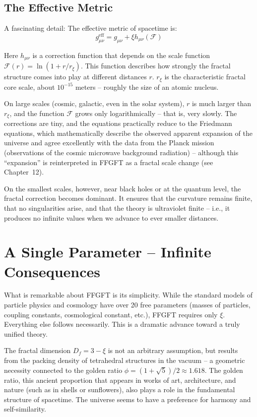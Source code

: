 \subsection{The Effective Metric}

A fascinating detail: The effective metric of spacetime is:
\begin{equation}
g_{\mu\nu}^{\text{eff}} = g_{\mu\nu} + \xi h_{\mu\nu}(\mathcal{F})
\end{equation}

Here $h_{\mu\nu}$ is a correction function that depends on the scale function $\mathcal{F}(r) = \ln(1 + r/r_\xi)$. This function describes how strongly the fractal structure comes into play at different distances $r$. $r_\xi$ is the characteristic fractal core scale, about $10^{-15}$ meters -- roughly the size of an atomic nucleus.

On large scales (cosmic, galactic, even in the solar system), $r$ is much larger than $r_\xi$, and the function $\mathcal{F}$ grows only logarithmically -- that is, very slowly. The corrections are tiny, and the equations practically reduce to the Friedmann equations, which mathematically describe the observed apparent expansion of the universe and agree excellently with the data from the Planck mission (observations of the cosmic microwave background radiation) -- although this ``expansion'' is reinterpreted in FFGFT as a fractal scale change (see Chapter~12).

On the smallest scales, however, near black holes or at the quantum level, the fractal correction becomes dominant. It ensures that the curvature remains finite, that no singularities arise, and that the theory is ultraviolet finite -- i.e., it produces no infinite values when we advance to ever smaller distances.

\section{A Single Parameter -- Infinite Consequences}

What is remarkable about FFGFT is its simplicity. While the standard models of particle physics and cosmology have over 20 free parameters (masses of particles, coupling constants, cosmological constant, etc.), FFGFT requires only $\xi$. Everything else follows necessarily. This is a dramatic advance toward a truly unified theory.

The fractal dimension $D_f = 3 - \xi$ is not an arbitrary assumption, but results from the packing density of tetrahedral structures in the vacuum -- a geometric necessity connected to the golden ratio $\phi = (1 + \sqrt{5})/2 \approx 1.618$. The golden ratio, this ancient proportion that appears in works of art, architecture, and nature (such as in shells or sunflowers), also plays a role in the fundamental structure of spacetime. The universe seems to have a preference for harmony and self-similarity.

